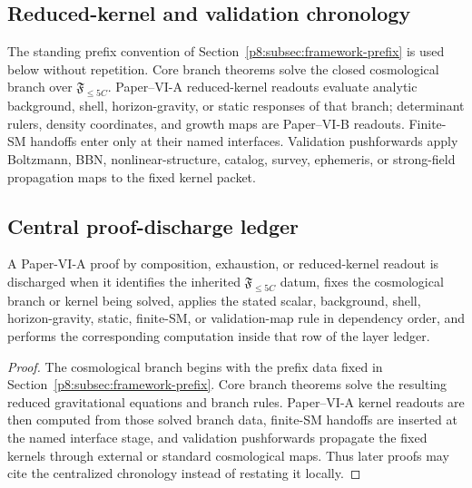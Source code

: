 \documentclass[12pt,a4paper]{article}
\begin{document}
\subsection*{Reduced-kernel and validation chronology}
\label{p8:sec:logical-status-export-boundary}

The standing prefix convention of Section~\ref{p8:subsec:framework-prefix} is used below without repetition.  Core branch theorems solve the closed cosmological branch over \(\mathfrak F_{\le5C}\).  Paper--VI-A reduced-kernel readouts evaluate analytic background, shell, horizon-gravity, or static responses of that branch; determinant rulers, density coordinates, and growth maps are Paper--VI-B readouts.  Finite-SM handoffs enter only at their named interfaces.  Validation pushforwards apply Boltzmann, BBN, nonlinear-structure, catalog, survey, ephemeris, or strong-field propagation maps to the fixed kernel packet.

\subsection*{Central proof-discharge ledger}
\label{p8:sec:central-proof-discharge-ledger}

\begin{proposition}
\label{p8:prop:central-proof-discharge}
A Paper-VI-A proof by composition, exhaustion, or reduced-kernel readout is discharged when it identifies the inherited \(\mathfrak F_{\le5C}\) datum, fixes the cosmological branch or kernel being solved, applies the stated scalar, background, shell, horizon-gravity, static, finite-SM, or validation-map rule in dependency order, and performs the corresponding computation inside that row of the layer ledger.
\end{proposition}

\begin{proof}
The cosmological branch begins with the prefix data fixed in Section~\ref{p8:subsec:framework-prefix}.  Core branch theorems solve the resulting reduced gravitational equations and branch rules.  Paper--VI-A kernel readouts are then computed from those solved branch data, finite-SM handoffs are inserted at the named interface stage, and validation pushforwards propagate the fixed kernels through external or standard cosmological maps.  Thus later proofs may cite the centralized chronology instead of restating it locally.
\end{proof}
\end{document}
